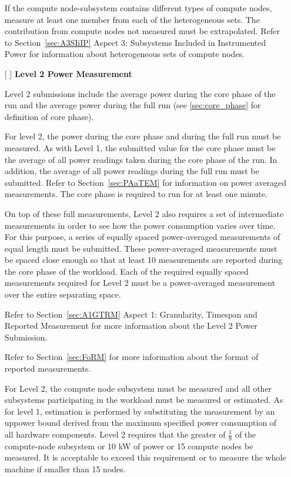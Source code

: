 \begin{itemize}
If the compute node-subsystem contains different types of compute nodes, measure at least one member from each of the heterogeneous sets. The contribution from compute nodes not measured must be extrapolated. Refer to 
Section~\ref{sec:A3SIiIP} Aspect 3: Subsystems Included in Instrumented Power for information about heterogeneous sets of compute nodes.

\newpage
\item[{[ ]}]
\textbf{Level 2 Power Measurement}

Level 2 submissions include the average power during the core phase of the run and the average power during the full run (see \ref{sec:core_phase} for definition of core phase).

For level 2, the power during the core phase and during the full run must be measured.
As with Level 1, the submitted value for the core phase must be the average of all power readings taken during the core phase of the run.
In addition, the average of all power readings during the full run must be submitted.
Refer to Section~\ref{sec:PAaTEM} for information on power averaged measurements.
The core phase is required to run for at least one minute.

On top of these full measurements, Level 2 also requires a set of intermediate measurements in order to see how the power consumption varies over time.
For this purpose, a series of equally spaced power-averaged measurements of equal length must be submitted.
These power-averaged measurements must be spaced close enough so that at least 10 measurements are reported during the core phase of the workload.
Each of the required equally spaced measurements required for Level 2 must be a power-averaged measurement over the entire separating space. 

Refer to Section~\ref{sec:A1GTRM} Aspect 1: Granularity, Timespan and Reported Measurement for more information about the Level 2 Power Submission. 

Refer to Section~\ref{sec:FoRM} for more information about the format of reported measurements.

For Level 2, the compute node subsystem must be measured and all other subsystems participating in the workload must be measured or estimated.
As for level 1, estimation is performed by substituting the measurement by an uppower bound derived from the maximum specified power consumption of all hardware components.
Level 2 requires that the greater of $ \frac{1}{8} $ of the compute-node subsystem or 10 kW of power or 15 compute nodes be measured.
It is acceptable to exceed this requirement or to measure the whole machine if smaller than 15 nodes.


\end{itemize}
